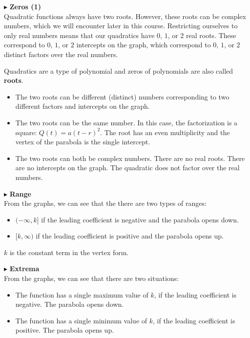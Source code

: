 \documentclass{ximera}
\begin{document}
$\blacktriangleright$ \textbf{\textcolor{red!10!blue!90!}{Zeros (1)}} \\
Quadratic functions always have two roots.  However, these roots can be complex numbers, which we will encounter later in this course.  Restricting ourselves to only real numbers means that our quadratics have $0$, $1$, or $2$ real roots.  These correspond to  $0$, $1$, or $2$ intercepts on the graph, which correspond to $0$, $1$, or $2$ distinct factors over the real numbers. 

Quadratics are a type of polynomial and zeros of polynomials are also called \textbf{roots}.

\begin{itemize}
\item The two roots can be different (distinct) numbers corresponding to two different factors and intercepts on the graph.  
\item The two roots can be the same number.  In this case, the factorization is a square: $Q(t) = a(t-r)^2$.  The root has an even multiplicity and the vertex of the parabola is the single intercept.
\item The two roots can both be complex numbers.  There are no real roots. There are no intercepts on the graph. The quadratic does not factor over the real numbers.
\end{itemize}


$\blacktriangleright$ \textbf{\textcolor{red!10!blue!90!}{Range}} \\
From the graphs, we can see that the there are two types of ranges: 
\begin{itemize}
\item $(-\infty, k]$ if the leading coefficient is negative and the parabola opens down.
\item $[k, \infty)$ if the leading coefficient is positive and the parabola opens up.
\end{itemize}

$k$ is the constant term in the vertex form.



$\blacktriangleright$  \textbf{\textcolor{red!10!blue!90!}{Extrema}} \\
From the graphs, we can see that there are two situations:
\begin{itemize}
\item The function has a single maximum value of $k$, if the leading coefficient is negative. The parabola opens down.
\item The function has a single minimum value of $k$, if the leading coefficient is positive. The parabola opens up.
\end{itemize}
\end{document}
